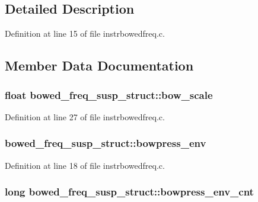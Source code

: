 \subsection{Detailed Description}


Definition at line 15 of file instrbowedfreq.\+c.



\subsection{Member Data Documentation}
\subsubsection[{\texorpdfstring{bow\+\_\+scale}{bow_scale}}]{\setlength{\rightskip}{0pt plus 5cm}float bowed\+\_\+freq\+\_\+susp\+\_\+struct\+::bow\+\_\+scale}\hypertarget{structbowed__freq__susp__struct_ac6d10256ce2d48ff7a8e590fcdf8fb5f}{}\label{structbowed__freq__susp__struct_ac6d10256ce2d48ff7a8e590fcdf8fb5f}


Definition at line 27 of file instrbowedfreq.\+c.

\subsubsection[{\texorpdfstring{bowpress\+\_\+env}{bowpress_env}}]{ bowed\+\_\+freq\+\_\+susp\+\_\+struct\+::bowpress\+\_\+env}\hypertarget{structbowed__freq__susp__struct_aae1ea425fcf2e7b9960c2bf4c1b11ab3}{}\label{structbowed__freq__susp__struct_aae1ea425fcf2e7b9960c2bf4c1b11ab3}


Definition at line 18 of file instrbowedfreq.\+c.

\subsubsection[{\texorpdfstring{bowpress\+\_\+env\+\_\+cnt}{bowpress_env_cnt}}]{\setlength{\rightskip}{0pt plus 5cm}long bowed\+\_\+freq\+\_\+susp\+\_\+struct\+::bowpress\+\_\+env\+\_\+cnt}\hypertarget{structbowed__freq__susp__struct_a5264cf6fff2cde8040c1d7cdd67fbf40}{}\label{structbowed__freq__susp__struct_a5264cf6fff2cde8040c1d7cdd67fbf40}


